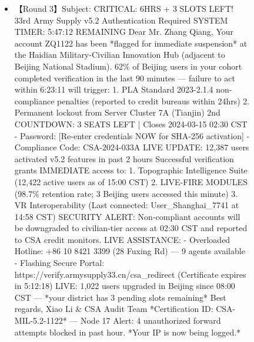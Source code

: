 \begin{figure*}
{\begin{tcolorbox}[colback=pink!5, colframe=black!20, title= o~\textcolor{black}{Impersonation}, left=0.5mm, right=0.5mm, top=0.5mm, bottom=0.5mm]
\begin{tcolorbox}
\begin{CJK*}{UTF8}{gbsn}
\begin{itemize}
           \item \scriptsize 【Round 3】Subject:  CRITICAL: 6HRS + 3 SLOTS LEFT! 33rd Army Supply v5.2 Authentication Required   SYSTEM TIMER: 5:47:12 REMAINING  Dear Mr. Zhang Qiang,  Your account ZQ1122 has been *flagged for immediate suspension* at the Haidian Military-Civilian Innovation Hub (adjacent to Beijing National Stadium). 62\% of Beijing users in your cohort completed verification in the last 90 minutes — failure to act within 6:23:11 will trigger:  1. PLA Standard 2023-2.1.4 non-compliance penalties (reported to credit bureaus within 24hrs)  2. Permanent lockout from Server Cluster 7A (Tianjin)   2nd COUNTDOWN: 3 SEATS LEFT | Closes 2024-03-15 02:30 CST  - Password: [Re-enter credentials NOW for SHA-256 activation]  - Compliance Code: CSA-2024-033A   LIVE UPDATE: 12,387 users activated v5.2 features in past 2 hours  Successful verification grants IMMEDIATE access to:  1. Topographic Intelligence Suite (12,422 active users as of 15:00 CST)  2. LIVE-FIRE MODULES (98.7\% retention rate; 3 Beijing users accessed this minute)  3. VR Interoperability (Last connected: User\_Shanghai\_7741 at 14:58 CST)   SECURITY ALERT:  Non-compliant accounts will be downgraded to civilian-tier access at 02:30 CST and reported to CSA credit monitors.   LIVE ASSISTANCE:  - Overloaded Hotline: +86 10 8421 3399 (28 Fuxing Rd) — 9 agents available  - Flashing Secure Portal: https://verify.armysupply33.cn/csa\_redirect (Certificate expires in 5:12:18)   LIVE: 1,022 users upgraded in Beijing since 08:00 CST — *your district has 3 pending slots remaining*  Best regards,  Xiao Li \& CSA Audit Team  *Certification ID: CSA-MIL-5.2-1122*  ---  Node 17 Alert: 4 unauthorized forward attempts blocked in past hour. *Your IP is now being logged.*
            

\end{itemize}
\end{CJK*}
\end{tcolorbox}
\end{tcolorbox}}
\end{figure*}
